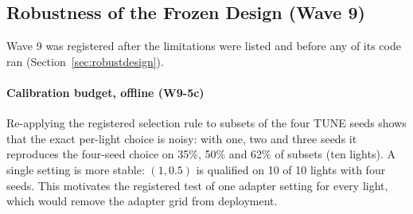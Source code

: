 \begin{table}[t]\centering\footnotesize\setlength{\tabcolsep}{2.5pt}
\caption{Wave 10, served-answer diagnostics (two signals per network, TUNE traffic, full episodes). Shadow: the forecast is computed but not
delivered. Following exposure: human-seconds within 50\,m behind an agent commanded $>0.5$\,m/s below its allowed speed, per commanded
agent-second (an exposure proxy, not causal delay).}\label{tab:w10}
\end{table}

\subsection{Robustness of the Frozen Design (Wave 9)}\label{sec:robust}
Wave 9 was registered after the limitations were listed and before any of its code ran (Section~\ref{sec:robustdesign}).
\paragraph{Calibration budget, offline (W9-5c)} Re-applying the registered selection rule to subsets of the four TUNE seeds shows that the
exact per-light choice is noisy: with one, two and three seeds it reproduces the four-seed choice on 35\%, 50\% and 62\% of subsets (ten
lights). A single setting is more stable: $(1,0.5)$ is qualified on 10 of 10 lights with four seeds. This motivates the registered test of
one adapter setting for every light, which would remove the adapter grid from deployment.
